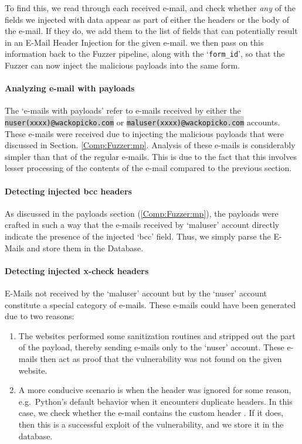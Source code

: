 To find this, we read through each received e-mail, and check whether \emph{any} of the fields we injected with data appear as part of either the headers or the body of the e-mail. If they do, we add them to the list of fields that can potentially result in an E-Mail Header Injection for the given e-mail. we then pass on this information back to the Fuzzer pipeline, along with the `\lstinline{form_id}', so that the Fuzzer can now inject the malicious payloads into the same form.

\paragraph{Analyzing e-mail with payloads}
The `e-mails with payloads' refer to e-mails received by either the \colorbox{lightgray}{\lstinline{nuser(xxxx)@wackopicko.com}} or \colorbox{lightgray}{\lstinline{maluser(xxxx)@wackopicko.com}} accounts. These e-mails were received due to injecting the malicious payloads that were discussed in Section. \ref{Comp:Fuzzer:mp}. Analysis of these e-mails is considerably simpler than that of the regular e-mails. This is due to the fact that this involves lesser processing of the contents of the e-mail compared to the previous section.
\paragraph{Detecting injected bcc headers}
As discussed in the payloads section (\ref{Comp:Fuzzer:mp}), the payloads were crafted in such a way that the e-mails received by `maluser' account directly indicate the presence of the injected `bcc' field. Thus, we simply parse the E-Mails and store them in the Database.

\label{analyze:detect_x_check}
\paragraph{Detecting injected x-check headers}
E-Mails not received by the `maluser' account but by the `nuser' account constitute a special category of e-mails.
These e-mails could have been generated due to two reasons:
\begin{enumerate}
	\item The websites performed some sanitization routines and stripped out the  part of the payload, thereby sending e-mails only to the `nuser' account. These e-mails then act as proof that the vulnerability was not found on the given website.
	\item A more conducive scenario is when the  header was ignored for some reason, e.g.\ Python's default behavior when it encounters duplicate headers. In this case, we check whether the e-mail contains the custom header . If it does, then this is a successful exploit of the vulnerability, and we store it in the database.
\end{enumerate}
